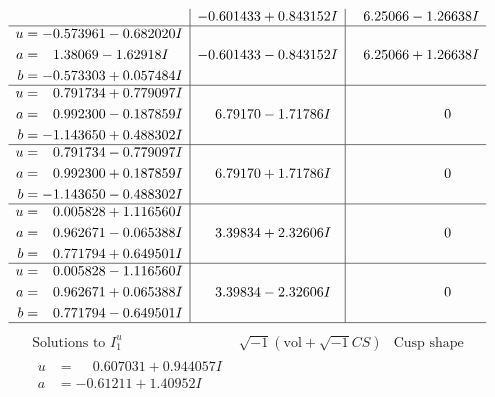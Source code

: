 \documentclass[1p]{elsarticle_modified}
\theoremstyle{definition}
\newcommand{\I}{\sqrt{-1}}
\begin{document}
$$\begin{array}{c|c|c}
 & -0.601433 + 0.843152 I & \phantom{-}6.25066 - 1.26638 I \\ \hline\begin{aligned}
u &= -0.573961 - 0.682020 I \\
a &= \phantom{-}1.38069 - 1.62918 I \\
b &= -0.573303 + 0.057484 I\end{aligned}
 & -0.601433 - 0.843152 I & \phantom{-}6.25066 + 1.26638 I \\ \hline\begin{aligned}
u &= \phantom{-}0.791734 + 0.779097 I \\
a &= \phantom{-}0.992300 - 0.187859 I \\
b &= -1.143650 + 0.488302 I\end{aligned}
 & \phantom{-}6.79170 - 1.71786 I & \phantom{-0.000000 } 0 \\ \hline\begin{aligned}
u &= \phantom{-}0.791734 - 0.779097 I \\
a &= \phantom{-}0.992300 + 0.187859 I \\
b &= -1.143650 - 0.488302 I\end{aligned}
 & \phantom{-}6.79170 + 1.71786 I & \phantom{-0.000000 } 0 \\ \hline\begin{aligned}
u &= \phantom{-}0.005828 + 1.116560 I \\
a &= \phantom{-}0.962671 - 0.065388 I \\
b &= \phantom{-}0.771794 + 0.649501 I\end{aligned}
 & \phantom{-}3.39834 + 2.32606 I & \phantom{-0.000000 } 0 \\ \hline\begin{aligned}
u &= \phantom{-}0.005828 - 1.116560 I \\
a &= \phantom{-}0.962671 + 0.065388 I \\
b &= \phantom{-}0.771794 - 0.649501 I\end{aligned}
 & \phantom{-}3.39834 - 2.32606 I & \phantom{-0.000000 } 0\\
 \hline 
 \end{array}$$\newpage$$\begin{array}{c|c|c}  
\text{Solutions to }I^u_{1}& \I (\text{vol} + \sqrt{-1}CS) & \text{Cusp shape}\\
 \hline 
\begin{aligned}
u &= \phantom{-}0.607031 + 0.944057 I \\
a &= -0.61211 + 1.40952 I \\

\end{aligned}
\end{array}$$
\end{document}
